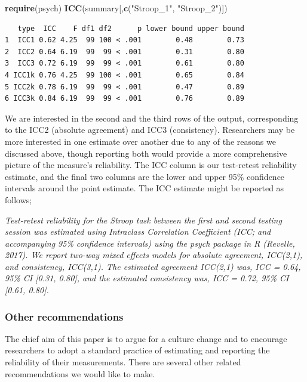 \documentclass[english,,man,floatsintext]{apa6}
\newenvironment{Shaded}{\begin{snugshade}}{\end{snugshade}}
\newcommand{\KeywordTok}[1]{\textcolor[rgb]{0.13,0.29,0.53}{\textbf{#1}}}
\newcommand{\NormalTok}[1]{#1}
\newcommand{\StringTok}[1]{\textcolor[rgb]{0.31,0.60,0.02}{#1}}
\begin{document}
\begin{Shaded}
\begin{Highlighting}[]
\KeywordTok{require}\NormalTok{(psych)}
\KeywordTok{ICC}\NormalTok{(summary[,}\KeywordTok{c}\NormalTok{(}\StringTok{"Stroop_1"}\NormalTok{, }\StringTok{"Stroop_2"}\NormalTok{)])}
\end{Highlighting}
\end{Shaded}

\newpage

\begin{verbatim}
   type  ICC    F df1 df2      p lower bound upper bound
1  ICC1 0.62 4.25  99 100 < .001        0.48        0.73
2  ICC2 0.64 6.19  99  99 < .001        0.31        0.80
3  ICC3 0.72 6.19  99  99 < .001        0.61        0.80
4 ICC1k 0.76 4.25  99 100 < .001        0.65        0.84
5 ICC2k 0.78 6.19  99  99 < .001        0.47        0.89
6 ICC3k 0.84 6.19  99  99 < .001        0.76        0.89
\end{verbatim}

We are interested in the second and the third rows of the output, corresponding to the ICC2 (absolute agreement) and ICC3 (consistency). Researchers may be more interested in one estimate over another due to any of the reasons we discussed above, though reporting both would provide a more comprehensive picture of the measure's reliability. The ICC column is our test-retest reliability estimate, and the final two columns are the lower and upper 95\% confidence intervals around the point estimate. The ICC estimate might be reported as follows;

\emph{Test-retest reliability for the Stroop task between the first and second testing session was estimated using Intraclass Correlation Coefficient (ICC; and accompanying 95\% confidence intervals) using the psych package in R (Revelle, 2017). We report two-way mixed effects models for absolute agreement, ICC(2,1), and consistency, ICC(3,1). The estimated agreement ICC(2,1) was, ICC = 0.64, 95\% CI {[}0.31, 0.80{]}, and the estimated consistency was, ICC = 0.72, 95\% CI {[}0.61, 0.80{]}.}

\hypertarget{other-recommendations}{%
\subsubsection{Other recommendations}\label{other-recommendations}}

The chief aim of this paper is to argue for a culture change and to encourage researchers to adopt a standard practice of estimating and reporting the reliability of their measurements. There are several other related recommendations we would like to make.
\end{document}

